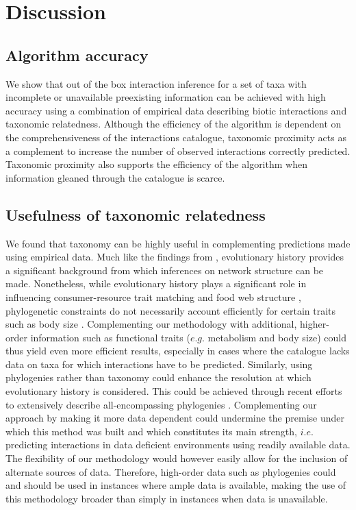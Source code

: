 \section{Discussion}
\subsection{Algorithm accuracy}
We show that out of the box interaction inference for a set of taxa with incomplete or unavailable preexisting information can be achieved with high accuracy using a combination of empirical data describing biotic interactions and taxonomic relatedness. Although the efficiency of the algorithm is dependent on the comprehensiveness of the interactions catalogue, taxonomic proximity acts as a complement to increase the number of observed interactions correctly predicted. Taxonomic proximity also supports the efficiency of the algorithm when information gleaned through the catalogue is scarce.

\subsection{Usefulness of taxonomic relatedness}
We found that taxonomy can be highly useful in complementing predictions made using empirical data. Much like the findings from \citet{eklof2016}, evolutionary history provides a significant background from which inferences on network structure can be made. Nonetheless, while evolutionary history plays a significant role in influencing consumer-resource trait matching and food web structure \citep{mouquet2012, rohr2014}, phylogenetic constraints do not necessarily account efficiently for certain traits such as body size \citep{eklof2016}. Complementing our methodology with additional, higher-order information such as functional traits ($e.g.$ metabolism and body size) could thus yield even more efficient results, especially in cases where the catalogue lacks data on taxa for which interactions have to be predicted. Similarly, using phylogenies rather than taxonomy could enhance the resolution at which evolutionary history is considered. This could be achieved through recent efforts to extensively describe all-encompassing phylogenies \citep[e.g.][]{Hedges2015}. Complementing our approach by making it more data dependent could undermine the premise under which this method was built and which constitutes its main strength, $i.e.$ predicting interactions in data deficient environments using readily available data. The flexibility of our methodology would however easily allow for the inclusion of alternate sources of data. Therefore, high-order data such as phylogenies could and should be used in instances where ample data is available, making the use of this methodology broader than simply in instances when data is unavailable.

